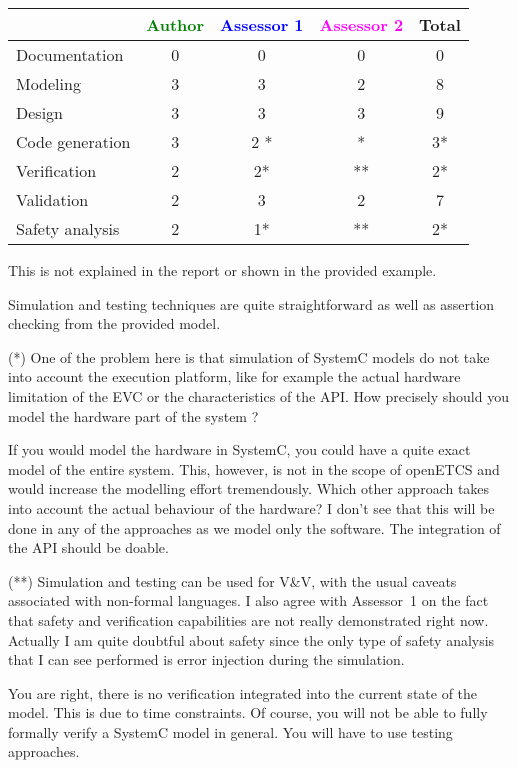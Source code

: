 \begin{tabular}{|l | c | c | c | c|}
\hline
& \textcolor{green}{Author} & \textcolor{blue}{Assessor 1} & \textcolor{magenta}{Assessor 2} & Total \\
\hline
Documentation &0 & 0 & 0 & 0 \\
\hline
Modeling &3 & 3 & 2 & 8 \\
\hline
Design &3 &3 & 3 & 9 \\
\hline
Code generation &3 & 2 *  & * & 3* \\
\hline
Verification &2 & 2* & ** & 2* \\
\hline
Validation &2 &3 & 2 & 7 \\
\hline
Safety analysis &2 & 1* & ** & 2* \\
\hline
\end{tabular}
\begin{assessor1}
This is not explained in the report or shown in  the provided example.

Simulation and testing techniques are quite straightforward as well as
assertion checking from the provided model.
\end{assessor1}

\begin{assessor2}
  \begin{item}
  \item[(*)] One of the problem here is that simulation of SystemC
    models do not take into account the execution platform, like for
    example the actual hardware limitation of the EVC or the
    characteristics of the API. How precisely should you model the
    hardware part of the system ?
\begin{author_comment}
If you would model the hardware in SystemC, you could have a quite exact model of the entire system. This, however, is not in the scope of openETCS and would increase the modelling effort tremendously. Which other approach takes into account the actual behaviour of the hardware? I don't see that this will be done in any of the approaches as we model only the software. The integration of the API should be doable.
\end{author_comment}
  \item[(**)] Simulation and testing can be used for V\&V, with the
    usual caveats associated with non-formal languages. I also agree
    with Assessor~1 on the fact that safety and verification
    capabilities are not really demonstrated right now. Actually I am
    quite doubtful about safety since the only type of safety analysis
    that I can see performed is error injection during the simulation.
\begin{author_comment}
You are right, there is no verification integrated into the current state of the model. This is due to time constraints. Of course, you will not be able to fully formally verify a SystemC model in general. You will have to use testing approaches.
\end{author_comment}
  \end{item}
\end{assessor2}

